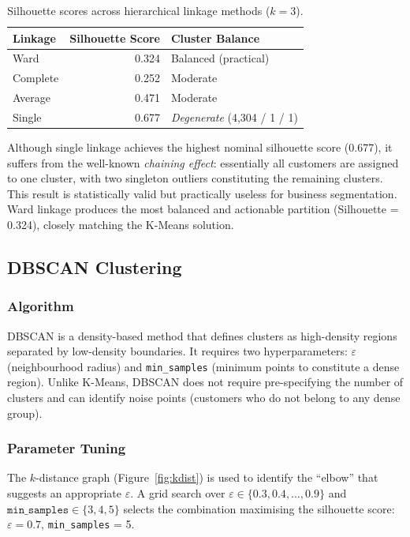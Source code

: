 \documentclass[12pt,a4paper]{article}
\begin{document}
\begin{table}[H]
  \centering
  \caption{Silhouette scores across hierarchical linkage methods ($k=3$).}
  \label{tab:linkage}
  \begin{tabular}{lrl}
    \toprule
    \textbf{Linkage} & \textbf{Silhouette Score} & \textbf{Cluster Balance} \\
    \midrule
    Ward     & 0.324 & Balanced (practical) \\
    Complete & 0.252 & Moderate             \\
    Average  & 0.471 & Moderate             \\
    Single   & 0.677 & \emph{Degenerate} (4,304 / 1 / 1) \\
    \bottomrule
  \end{tabular}
\end{table}

Although single linkage achieves the highest nominal silhouette score (0.677),
it suffers from the well-known \emph{chaining effect}: essentially all customers
are assigned to one cluster, with two singleton outliers constituting the remaining
clusters.  This result is statistically valid but practically useless for business
segmentation.  Ward linkage produces the most balanced and actionable partition
(Silhouette = 0.324), closely matching the K-Means solution.

\subsection{DBSCAN Clustering}

\subsubsection{Algorithm}

DBSCAN \parencite{ester1996dbscan} is a density-based method that defines clusters
as high-density regions separated by low-density boundaries.  It requires two
hyperparameters: $\varepsilon$ (neighbourhood radius) and \texttt{min\_samples}
(minimum points to constitute a dense region).  Unlike K-Means, DBSCAN does not
require pre-specifying the number of clusters and can identify noise points
(customers who do not belong to any dense group).

\subsubsection{Parameter Tuning}

The $k$-distance graph (Figure~\ref{fig:kdist}) is used to identify the ``elbow''
that suggests an appropriate $\varepsilon$.  A grid search over
$\varepsilon \in \{0.3, 0.4, \ldots, 0.9\}$ and
$\texttt{min\_samples} \in \{3, 4, 5\}$ selects the combination maximising the
silhouette score: $\varepsilon = 0.7$, \texttt{min\_samples} = 5.
\end{document}
